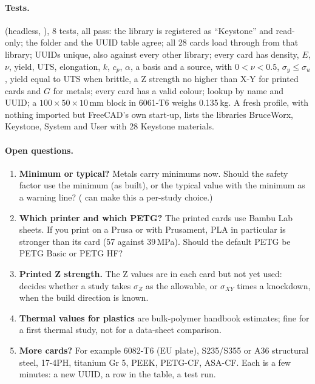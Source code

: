 \paragraph{Tests.}  (headless, ), 8 tests,
all pass: the library is registered as ``Keystone'' and read-only; the folder and the UUID table agree; all 28 cards
load through  from that library; UUIDs unique, also against every other library; every
card has density, $E$, $\nu$, yield, UTS, elongation, $k$, $c_p$, $\alpha$, a basis and a source, with $0<\nu<0.5$,
$\sigma_y \le \sigma_u$, yield equal to UTS when brittle, a Z strength no higher than X-Y for printed cards and $G$
for metals; every card has a valid colour; lookup by name and UUID; a $100\times50\times10$\,mm block in 6061-T6
weighs 0.135\,kg. A fresh profile, with nothing imported but FreeCAD's own start-up, lists the libraries BruceWorx,
Keystone, System and User with 28 Keystone materials.

\paragraph{Open questions.}
\begin{enumerate}[nosep]
  \item \textbf{Minimum or typical?} Metals carry minimums now. Should the safety factor use the minimum (as built),
        or the typical value with the minimum as a warning line? ( can make this a per-study choice.)
  \item \textbf{Which printer and which PETG?} The printed cards use Bambu Lab sheets. If you print on a Prusa or with
        Prusament, PLA in particular is stronger than its card (57 against 39\,MPa). Should the default PETG be PETG
        Basic or PETG HF?
  \item \textbf{Printed Z strength.} The Z values are in each card but not yet used:  decides whether a
        study takes $\sigma_Z$ as the allowable, or $\sigma_{XY}$ times a knockdown, when the build direction is known.
  \item \textbf{Thermal values for plastics} are bulk-polymer handbook estimates; fine for a first thermal study, not
        for a data-sheet comparison.
  \item \textbf{More cards?} For example 6082-T6 (EU plate), S235/S355 or A36 structural steel, 17-4PH, titanium Gr 5,
        PEEK, PETG-CF, ASA-CF. Each is a few minutes: a new UUID, a row in the table, a test run.
\end{enumerate}

